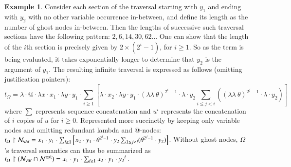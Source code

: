 \documentclass{elsarticle}
\theoremstyle{plain}
\theoremstyle{definition}
\newtheorem{example}{Example}[section]
\theoremstyle{remark}
\newcommand\Nodes{\mathcal{N}}%
\newcommand\NodesVar{\Nodes_{\sf var}}%
\newcommand{\ghostlmd}{{\lambda\!\!\lambda}}
\newcommand{\ghostvar}{\theta}
\newcommand{\ExternalNodes}{\Nodes^{\sf ext}}
\begin{document}
\begin{example}
    Consider each section of the traversal starting with $y_1$ and ending with $y_2$ with no other variable occurrence in-between, and define its length as the number of ghost nodes in-between. Then the lengths of successive such traversal sections have the following pattern: $2,6,14,30,62\ldots$
    One can show that the length of the $i$th section is precisely given by $2\times(2^i-1)$, for $i\geq1$.
    So as the term is being evaluated, it takes exponentially longer to determine that $y_2$ is the argument of $y_1$.
    The resulting infinite traversal is expressed as follows (omitting justification pointers):
    \begin{equation*}
    t_\Omega = \lambda \cdot @ \cdot \lambda x \cdot  x_1 \cdot \lambda y \cdot y_1
    \cdot  \sum_{i\geq 1}
        \left[
            \lambda \cdot x_2 \cdot \lambda y \cdot y_1 \cdot
             {(\ghostlmd\ \ghostvar)}^{2^i -1}\cdot \lambda \cdot y_2
                 \sum_{i\leq j<i}
                    \left(
                        {(\ghostlmd\ \ghostvar)}^{2^j -1}
                        \cdot
                        \lambda \cdot y_2
                    \right)
        \right]
    \end{equation*}
    where $\sum$ represents sequence concatenation and $u^i$ represents the concatenation of $i$ copies of $u$ for $i\geq 0$.
    Represented more succinctly by keeping only variable nodes and omitting redundant lambda and @-nodes:
    $t_\Omega \filter \NodesVar =  x_1 \cdot y_1
        \cdot  \sum_{i\geq 1}
            \left[
                x_2 \cdot y_1 \cdot
                 \ghostvar^{2^i -1}\cdot y_2
                     \sum_{1\leq j <i} (\ghostvar^{2^j -1} \cdot y_2)
            \right]
    $.
    Without ghost nodes, $\Omega$'s traversal semantics can thus be summarized as
    $
        t_\Omega \filter (\NodesVar\inter\ExternalNodes) =  x_1 \cdot y_1
        \cdot  \sum_{i\geq 1} x_2 \cdot y_1 \cdot {y_2}^i \ .
    $
\end{example}
\end{document}

